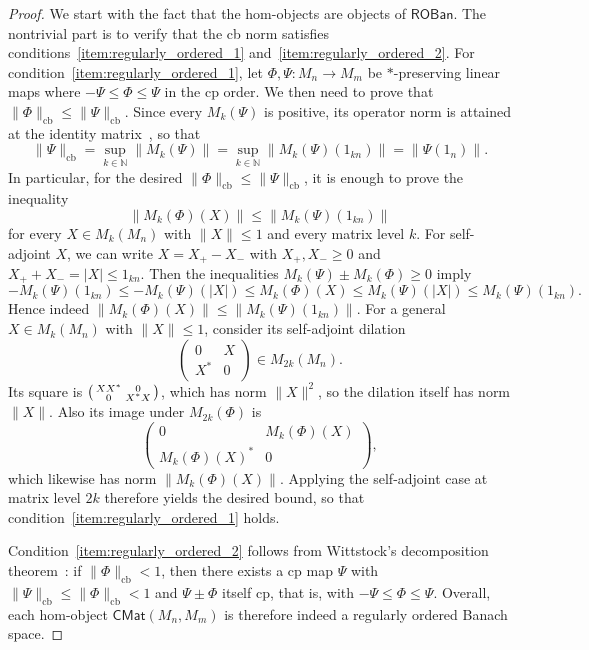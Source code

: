 \documentclass[11pt,onecolumn]{article}
\newcommand{\N}{\mathbb{N}}
\newcommand{\ROBan}{\mathsf{ROBan}}
\theoremstyle{plain}
\theoremstyle{remark}
\theoremstyle{definition}
\begin{document}
\begin{proof}
	We start with the fact that the hom-objects are objects of $\ROBan$.
	The nontrivial part is to verify that the cb norm satisfies conditions~\ref{item:regularly_ordered_1} and~\ref{item:regularly_ordered_2}.
	For condition~\ref{item:regularly_ordered_1}, let $\Phi,\Psi \colon M_n \to M_m$ be $*$-preserving linear maps where $-\Psi \le \Phi \le \Psi$ in the cp order.
	We then need to prove that $\|\Phi\|_{\mathrm{cb}} \le \|\Psi\|_{\mathrm{cb}}$.
	Since every $M_k(\Psi)$ is positive, its operator norm is attained at the identity matrix~\cite[Corollary~2.9]{Paulsen}, so that
	\[
		\|\Psi\|_{\mathrm{cb}} = \sup_{k \in \N} \|M_k(\Psi)\| = \sup_{k \in \N} \|M_k(\Psi)(1_{kn})\| = \|\Psi(1_n)\|.
	\]
	In particular, for the desired $\|\Phi\|_{\mathrm{cb}} \le \|\Psi\|_{\mathrm{cb}}$,
	it is enough to prove the inequality
	\[
		\|M_k(\Phi)(X)\| \le \|M_k(\Psi)(1_{kn})\|
	\]
	for every $X \in M_k(M_n)$ with $\|X\| \le 1$ and every matrix level $k$.
	For self-adjoint $X$, we can write $X = X_+ - X_-$ with $X_+,X_- \ge 0$ and $X_+ + X_- = |X| \le 1_{kn}$.
	Then the inequalities $M_k(\Psi) \pm M_k(\Phi) \ge 0$ imply
	\[
		-M_k(\Psi)(1_{kn}) \le -M_k(\Psi)(|X|) \le M_k(\Phi)(X) \le M_k(\Psi)(|X|) \le M_k(\Psi)(1_{kn}).
	\]
	Hence indeed $\|M_k(\Phi)(X)\| \le \|M_k(\Psi)(1_{kn})\|$.
	For a general $X \in M_k(M_n)$ with $\|X\| \le 1$, consider its self-adjoint dilation
	\[
		\begin{pmatrix}
			0 & X \\
			X^* & 0
		\end{pmatrix}
		\in M_{2k}(M_n).
	\]
	Its square is $\begin{psmallmatrix} XX^* & 0 \\ 0 & X^*X \end{psmallmatrix}$, which has norm $\|X\|^2$, so the dilation itself has norm $\|X\|$.
	Also its image under $M_{2k}(\Phi)$ is
	\[
		\begin{pmatrix}
			0 & M_k(\Phi)(X) \\
			M_k(\Phi)(X)^* & 0
		\end{pmatrix},
	\]
	which likewise has norm $\|M_k(\Phi)(X)\|$.
	Applying the self-adjoint case at matrix level $2k$ therefore yields the desired bound, so that condition~\ref{item:regularly_ordered_1} holds.

	Condition~\ref{item:regularly_ordered_2} follows from Wittstock's decomposition theorem~\cite[Theorem~8.5]{Paulsen}: if $\|\Phi\|_{\mathrm{cb}} < 1$, then there exists a cp map $\Psi$ with $\|\Psi\|_{\mathrm{cb}} \le \|\Phi\|_{\mathrm{cb}} < 1$ and $\Psi \pm \Phi$ itself cp, that is, with $-\Psi \le \Phi \le \Psi$.
	Overall, each hom-object $\mathsf{CMat}(M_n,M_m)$ is therefore indeed a regularly ordered Banach space.


\end{proof}
\end{document}
